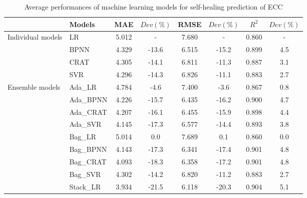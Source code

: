 \documentclass[11pt]{article}
\begin{document}
		\begin{table}[!h]
		\small
		\centering
		\caption{Average performances of machine learning models for self-healing prediction of ECC}
		\begin{tabular*}{0.75\textwidth}{ll|cc|cc|cc}
			\toprule
			&	Models	&	MAE	&	$Dev(\%)$	&	RMSE	&	$Dev(\%)$	&	$R^2$	&	$Dev(\%)$	\\
			\midrule
			\multirow{4}{0.55in}{Individual models} &	LR	&	5.012	&	-	&	7.680	&	-	&	0.860	&	-	\\
			
			&	BPNN	&	4.329	&	-13.6	&	6.515	&	-15.2	&	0.899	&	4.5	\\
			
			&	CRAT	&	4.305	&	-14.1	&	6.811	&	-11.3	&	0.887	&	3.1	\\
			
			&	SVR	&	4.296	&	-14.3	&	6.826	&	-11.1	&	0.883	&	2.7	\\
			
			\midrule
			\multirow{10}{0.55in}{Ensemble models} 	&	Ada\_LR	&	4.784	&	-4.6	&	7.400	&	-3.6	&	0.867	&	0.8	\\
			
			&	Ada\_BPNN	&	4.226	&	-15.7	&	6.435	&	-16.2	&	0.900	&	4.7	\\
			
			&	Ada\_CRAT	&	4.207	&	-16.1	&	6.455	&	-15.9	&	0.898	&	4.4	\\
			
			&	Ada\_SVR	&	4.145	&	-17.3	&	6.577	&	-14.4	&	0.893	&	3.8	\\
			
			&	Bag\_LR	&	5.014	&	0.0	&	7.689	&	0.1	&	0.860	&	0.0	\\
			
			&	Bag\_BPNN	&	4.143	&	-17.3	&	6.341	&	-17.4	&	0.901	&	4.8	\\
			
			&	Bag\_CRAT	&	4.093	&	-18.3	&	6.358	&	-17.2	&	0.901	&	4.8	\\
			
			&	Bag\_SVR	&	4.302	&	-14.2	&	6.820	&	-11.2	&	0.883	&	2.7	\\
			
			&	Stack\_LR	&	3.934	&	-21.5	&	6.118	&	-20.3	&	0.904	&	5.1	\\
			\bottomrule
		\end{tabular*}
		\label{per}
	\end{table} 
	
\end{document}
